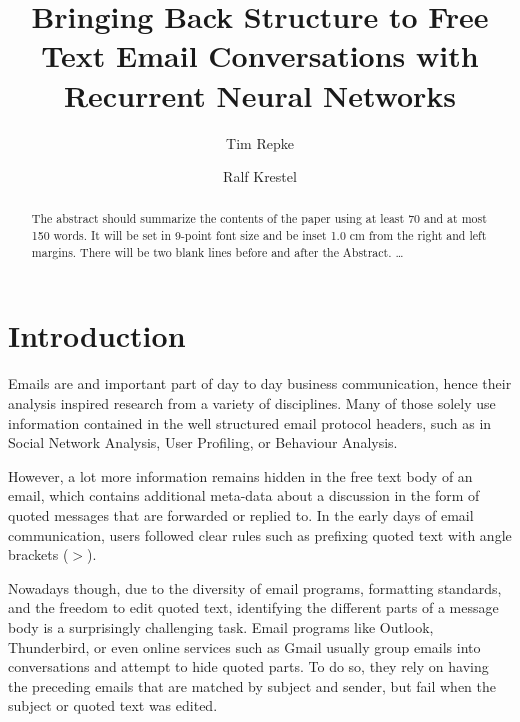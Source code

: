 \documentclass{llncs}
\begin{document}
%
\frontmatter          %
%
\pagestyle{headings}  %

\mainmatter              %
%
\title{Bringing Back Structure to Free Text Email Conversations with Recurrent Neural Networks}
%
%
\author{Tim Repke \and Ralf Krestel}
%
%
%

\maketitle              %

\begin{abstract}
The abstract should summarize the contents of the paper
using at least 70 and at most 150 words. It will be set in 9-point
font size and be inset 1.0 cm from the right and left margins.
There will be two blank lines before and after the Abstract. \dots
\end{abstract}
%
\section{Introduction}
Emails are and important part of day to day business communication, hence their analysis inspired research from a variety of disciplines.
Many of those solely use information contained in the well structured email protocol headers, such as in Social Network Analysis, User Profiling, or Behaviour Analysis.

However, a lot more information remains hidden in the free text body of an email, which contains additional meta-data about a discussion in the form of quoted messages that are forwarded or replied to.
In the early days of email communication, users followed clear rules such as prefixing quoted text with angle brackets ($>$).

Nowadays though, due to the diversity of email programs, formatting standards, and the freedom to edit quoted text, identifying the different parts of a message body is a surprisingly challenging task.
Email programs like Outlook, Thunderbird, or even online services such as Gmail usually group emails into conversations and attempt to hide quoted parts.
To do so, they rely on having the preceding emails that are matched by subject and sender, but fail when the subject or quoted text was edited.
\end{document}
